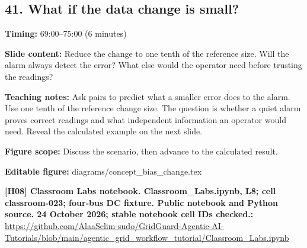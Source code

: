 \documentclass[10pt,letterpaper]{article}
\begin{document}
\subsection*{41. What if the data change is small?}
\textbf{Timing:} 69:00--75:00 (6 minutes)\par
\textbf{Slide content:} Reduce the change to one tenth of the reference size.
Will the alarm always detect the error?
What else would the operator need before trusting the readings?\par
\textbf{Teaching notes:} Ask pairs to predict what a smaller error does to the alarm. Use one tenth of the reference change size. The question is whether a quiet alarm proves correct readings and what independent information an operator would need. Reveal the calculated example on the next slide.\par
\textbf{Figure scope:} Discuss the scenario, then advance to the calculated result.\par
\textbf{Editable figure:} diagrams/concept\_bias\_change.tex\par
\textbf{[H08] Classroom Labs notebook. Classroom\_Labs.ipynb, L8; cell classroom-023; four-bus DC fixture. Public notebook and Python source. 24 October 2026; stable notebook cell IDs checked.:} \href{https://github.com/AlaaSelim-sudo/GridGuard-Agentic-AI-Tutorials/blob/main/agentic_grid_workflow_tutorial/Classroom_Labs.ipynb}{\small\ttfamily https:/\allowbreak{}/\allowbreak{}github.\allowbreak{}com/\allowbreak{}AlaaSelim-\allowbreak{}sudo/\allowbreak{}GridGuard-\allowbreak{}Agentic-\allowbreak{}AI-\allowbreak{}Tutorials/\allowbreak{}blob/\allowbreak{}main/\allowbreak{}agentic\_\allowbreak{}grid\_\allowbreak{}workflow\_\allowbreak{}tutorial/\allowbreak{}Classroom\_\allowbreak{}Labs.\allowbreak{}ipynb}\par
\par\medskip
\end{document}
